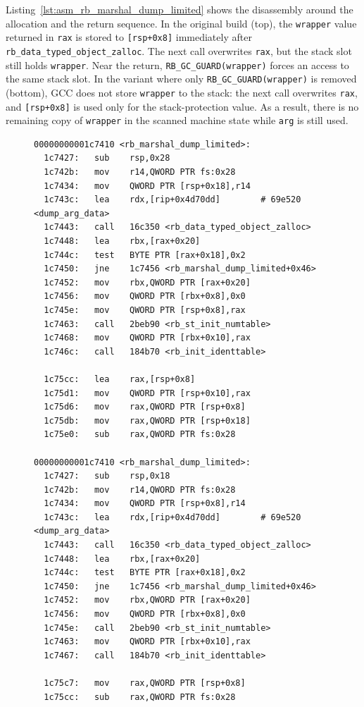 Listing~\ref{lst:asm_rb_marshal_dump_limited} shows the disassembly around the allocation and the return sequence. In the original build (top), the \texttt{wrapper} value returned in \texttt{rax} is stored to \texttt{[rsp+0x8]} immediately after \texttt{rb\_data\_typed\_object\_zalloc}. The next call overwrites \texttt{rax}, but the stack slot still holds \texttt{wrapper}. Near the return, \texttt{RB\_GC\_GUARD(wrapper)} forces an access to the same stack slot. In the variant where only \texttt{RB\_GC\_GUARD(wrapper)} is removed (bottom), GCC does not store \texttt{wrapper} to the stack: the next call overwrites \texttt{rax}, and \texttt{[rsp+0x8]} is used only for the stack-protection value. As a result, there is no remaining copy of \texttt{wrapper} in the scanned machine state while \texttt{arg} is still used.

\begin{figure}[tb]
\begin{lstlisting}[caption={Disassembly excerpts of \texttt{rb\_marshal\_dump\_limited} (GCC 15.2.1, x86\_64, \texttt{-O3}). Top: original with \texttt{RB\_GC\_GUARD(wrapper)}; bottom: guard removed and rebuilt.},label={lst:asm_rb_marshal_dump_limited}]
00000000001c7410 <rb_marshal_dump_limited>:
  1c7427:	sub    rsp,0x28
  1c742b:	mov    r14,QWORD PTR fs:0x28
  1c7434:	mov    QWORD PTR [rsp+0x18],r14
  1c743c:	lea    rdx,[rip+0x4d70dd]        # 69e520 <dump_arg_data>
  1c7443:	call   16c350 <rb_data_typed_object_zalloc>
  1c7448:	lea    rbx,[rax+0x20]
  1c744c:	test   BYTE PTR [rax+0x18],0x2
  1c7450:	jne    1c7456 <rb_marshal_dump_limited+0x46>
  1c7452:	mov    rbx,QWORD PTR [rax+0x20]
  1c7456:	mov    QWORD PTR [rbx+0x8],0x0
  1c745e:	mov    QWORD PTR [rsp+0x8],rax
  1c7463:	call   2beb90 <rb_st_init_numtable>
  1c7468:	mov    QWORD PTR [rbx+0x10],rax
  1c746c:	call   184b70 <rb_init_identtable>

  1c75cc:	lea    rax,[rsp+0x8]
  1c75d1:	mov    QWORD PTR [rsp+0x10],rax
  1c75d6:	mov    rax,QWORD PTR [rsp+0x8]
  1c75db:	mov    rax,QWORD PTR [rsp+0x18]
  1c75e0:	sub    rax,QWORD PTR fs:0x28

00000000001c7410 <rb_marshal_dump_limited>:
  1c7427:	sub    rsp,0x18
  1c742b:	mov    r14,QWORD PTR fs:0x28
  1c7434:	mov    QWORD PTR [rsp+0x8],r14
  1c743c:	lea    rdx,[rip+0x4d70dd]        # 69e520 <dump_arg_data>
  1c7443:	call   16c350 <rb_data_typed_object_zalloc>
  1c7448:	lea    rbx,[rax+0x20]
  1c744c:	test   BYTE PTR [rax+0x18],0x2
  1c7450:	jne    1c7456 <rb_marshal_dump_limited+0x46>
  1c7452:	mov    rbx,QWORD PTR [rax+0x20]
  1c7456:	mov    QWORD PTR [rbx+0x8],0x0
  1c745e:	call   2beb90 <rb_st_init_numtable>
  1c7463:	mov    QWORD PTR [rbx+0x10],rax
  1c7467:	call   184b70 <rb_init_identtable>

  1c75c7:	mov    rax,QWORD PTR [rsp+0x8]
  1c75cc:	sub    rax,QWORD PTR fs:0x28
\end{lstlisting}
\end{figure}


